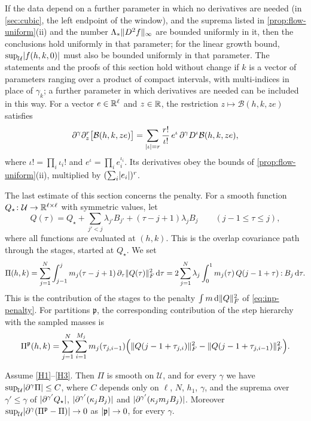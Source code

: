 \begin{remark}
\label{rem:flow-uniformity}
If the data depend on a further parameter in which no derivatives are needed
(in \cref{sec:cubic}, the left endpoint of the window), and the suprema listed in
\cref{prop:flow-uniform}(ii) and the number $\Lambda_*\lVert D^2f\rVert_\infty$ are
bounded uniformly in it, then the conclusions hold uniformly in that parameter;
for the linear growth bound, $\sup_{\mathcal U}\lvert f(h,k,0)\rvert$ must also be
bounded uniformly in that parameter.
The statements and the proofs of this section hold without change if $k$ is a
vector of parameters ranging over a product of compact intervals, with
multi-indices in place of $\gamma_k$; a further parameter in which derivatives
are needed can be included in this way. For a vector $e\in\mathbb R^\ell$ and $z\in\mathbb R$,
the restriction $z\mapsto\mathcal B(h,k,ze)$
satisfies
\[
 \partial^\gamma\partial_z^r\bigl[\mathcal B(h,k,ze)\bigr]
 =\sum_{\lvert \iota\rvert=r}\frac{r!}{\iota!}\,e^\iota\,\partial^\gamma D^\iota\mathcal B(h,k,ze),
\]
where $\iota!=\prod_i\iota_i!$ and $e^\iota=\prod_ie_i^{\iota_i}$. Its derivatives
obey the bounds of \cref{prop:flow-uniform}(ii), multiplied by
$(\sum_i\lvert e_i\rvert)^r$.
\end{remark}

The last estimate of this section concerns the penalty. For a smooth function
$Q_\star\colon\mathcal U\to\mathbb R^{\ell\times\ell}$ with symmetric values, let
\[
 Q(\tau)=Q_\star+\sum_{j'<j}\lambda_{j'}B_{j'}+(\tau-j+1)\lambda_jB_j
 \qquad(j-1\le\tau\le j),
\]
where all functions are evaluated at $(h,k)$. This is the overlap covariance
path through the stages, started at $Q_\star$. We set
\begin{equation}\label{eq:flow-penalty}
 \Pi(h,k)=\sum_{j=1}^N\int_{j-1}^jm_j(\tau-j+1)\,\partial_\tau\lVert Q(\tau)\rVert_F^2\,\mathrm d\tau
 =2\sum_{j=1}^N\lambda_j\int_0^1m_j(\tau)\,Q(j-1+\tau)\mathbin{:}B_j\,\mathrm d\tau.
\end{equation}
This is the contribution of the stages to the penalty $\int m\,\mathrm d\lVert Q\rVert_F^2$
of \eqref{eq:inp-penalty}. For partitions $\mathfrak p$, the corresponding
contribution of the step hierarchy with the sampled masses is
\[
 \Pi^{\mathfrak p}(h,k)=\sum_{j=1}^N\sum_{i=1}^{M_j}m_j(\tau_{j,i-1})
 \Bigl(\lVert Q(j-1+\tau_{j,i})\rVert_F^2-\lVert Q(j-1+\tau_{j,i-1})\rVert_F^2\Bigr).
\]

\begin{lemma}\label{lem:flow-penalty}
Assume \ref{H1}--\ref{H3}. Then $\Pi$ is smooth on $\mathcal U$, and for every
$\gamma$ we have $\sup_{\mathcal U}\lvert \partial^\gamma\Pi\rvert\le C$, where $C$
depends only on $\ell$, $N$, $h_1$, $\gamma$, and the suprema over $\gamma'\le\gamma$
of $\lvert \partial^{\gamma'}Q_\star\rvert$, $\lvert \partial^{\gamma'}(\kappa_jB_j)\rvert$ and
$\lvert \partial^{\gamma'}(\kappa_jm_jB_j)\rvert$. Moreover
$\sup_{\mathcal U}\lvert \partial^\gamma(\Pi^{\mathfrak p}-\Pi)\rvert\to0$ as
$\lvert \mathfrak p\rvert\to0$, for every $\gamma$.
\end{lemma}

